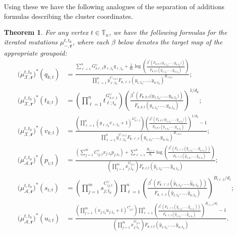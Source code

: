 \documentclass{amsart}
\newtheorem{theorem}{Theorem}[section]
\numberwithin{equation}{section}
\newcommand{\bfr}{{\boldsymbol{r}}}
\newcommand{\cA}{\mathcal{A}}
\newcommand{\cX}{\mathcal{X}}
\newcommand{\TT}{\mathbb{T}}
\begin{document}
Using these we have the following analogues of the separation of additions formulas describing the cluster coordinates.
\begin{theorem}
  \label{th:groupoid separation of additions}
  For any vertex $t\in\TT_n$, we have the following formulas for the iterated mutations $\mu_{-,\bfr}^{t,t_0}$, where each $\beta$ below denotes the target map of the appropriate groupoid:
  \begin{align}
    \nonumber \big(\mu_{\cX,\bfr}^{t,t_0}\big)^*(q_{k;t})&=\frac{ \sum_{\ell=1}^n G^\vee_{k\ell;t} y_{\ell;t_0} q_{\ell;t_0} +\frac{1}{d_k} \log\left(\frac{\beta^*\left(F_{\bfr,k;t}\big(y_{1;t_0},\ldots,y_{n;t_0}\big)\right)}{F_{\bfr,k;t}(y_{1;t_0},\ldots,y_{n;t_0})}\right)}{\prod_{\ell=1}^n y_{\ell;t_0}^{C_{\ell k;t}} F_{\bfr,\ell;t}(y_{1;t_0},\ldots,y_{n;t_0})^{B_{\ell k;t}}};\\
    \nonumber \big(\mu_{\cX,\bfr}^{t,t_0}\big)^*(t_{k;t})&=\left(\prod_{\ell=1}^n t_{\ell;t_0}^{G^\vee_{k\ell;t}}\right) \left(\frac{\beta^*\left(F_{\bfr,k;t}\big(y_{1;t_0},\ldots,y_{n;t_0}\big)\right)}{F_{\bfr,k;t}(y_{1;t_0},\ldots,y_{n;t_0})}\right)^{1/d_k};\\
    \nonumber \big(\mu_{\cX,\bfr}^{t,t_0}\big)^*(v_{k;t})&=\frac{\left(\prod_{\ell=1}^n (y_{\ell;t_0} v_{\ell;t_0} + 1)^{G^\vee_{k\ell;t}}\right) \left(\frac{\beta^*\left(F_{\bfr,k;t}\big(y_{1;t_0},\ldots,y_{n;t_0}\big)\right)}{F_{\bfr,k;t}(y_{1;t_0},\ldots,y_{n;t_0})}\right)^{1/d_k} - 1}{\prod_{\ell=1}^n y_{\ell;t_0}^{C_{\ell k;t}} F_{\bfr,\ell;t}(y_{1;t_0},\ldots,y_{n;t_0})^{B_{\ell k;t}}};\\
    \nonumber \big(\mu_{\cA,\bfr}^{t,t_0}\big)^*(p_{i;t})&=\frac{\left(\sum_{j=1}^m C^\vee_{ij;t} x_{j;t_0} p_{j;t_0}\right) + \sum_{\ell=1}^n \frac{B_{i\ell;t}}{d_\ell}\log\left(\frac{\beta^*\left(F_{\bfr,\ell;t}(\hat y_{1;t_0},\ldots,\hat y_{n;t_0})\right)}{F_{\bfr,\ell;t}(\hat y_{1;t_0},\ldots,\hat y_{n;t_0})}\right)}{\left(\prod_{j=1}^m x_{j;t_0}^{G_{ji;t}}\right) F_{\bfr,i;t}(\hat y_{1;t_0},\ldots,\hat y_{n;t_0})};\\
    \label{eq:groupoid separation of additions 2}
    \big(\mu_{\cA,\bfr}^{t,t_0}\big)^*(s_{i;t})&=\left(\prod_{j=1}^m s_{j;t_0}^{C^\vee_{ij;t}}\right) \prod_{\ell=1}^n \left(\frac{\beta^*\left(F_{\bfr,\ell;t}(\hat y_{1;t_0},\ldots,\hat y_{n;t_0})\right)}{F_{\bfr,\ell;t}(\hat y_{1;t_0},\ldots,\hat y_{n;t_0})}\right)^{B_{i\ell;t}/d_\ell};\\
    \nonumber \big(\mu_{\cA,\bfr}^{t,t_0}\big)^*(u_{i;t})&=\frac{\left(\prod_{j=1}^m (x_{j;t_0} u_{j;t_0} + 1)^{C^\vee_{ij;t}}\right) \prod_{\ell=1}^n \left(\frac{\beta^*\left(F_{\bfr,\ell;t}(\hat y_{1;t_0},\ldots,\hat y_{n;t_0})\right)}{F_{\bfr,\ell;t}(\hat y_{1;t_0},\ldots,\hat y_{n;t_0})}\right)^{B_{i\ell;t}/d_\ell} - 1}{\left(\prod_{j=1}^m x_{j;t_0}^{G_{ji;t}}\right) F_{\bfr,i;t}(\hat y_{1;t_0},\ldots,\hat y_{n;t_0})}.

\end{align}
\end{theorem}
\end{document}
